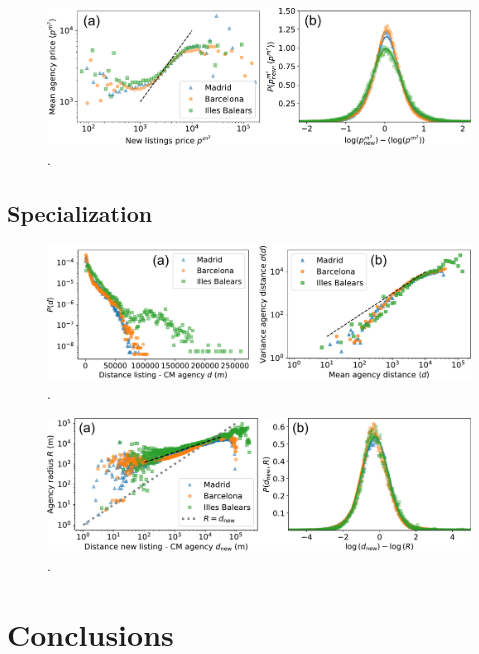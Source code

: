 \begin{figure}
    \label{fig:attach_price}
    \centering
    \includegraphics[width =\textwidth]{Figs/Idealista_dynamics/panel_attach_price.pdf}
	\caption[.]{ . }
\end{figure}

\subsection{Specialization}

\begin{figure}
    \label{fig:distance_panel}
    \centering
    \includegraphics[width =\textwidth]{Figs/Idealista_dynamics/distance_panel.pdf}
	\caption[.]{ . }
\end{figure}

\begin{figure}
    \label{fig:distance_attach}
    \centering
    \includegraphics[width =\textwidth]{Figs/Idealista_dynamics/distance_attach.pdf}
	\caption[.]{ . }
\end{figure}

\section{Conclusions}













